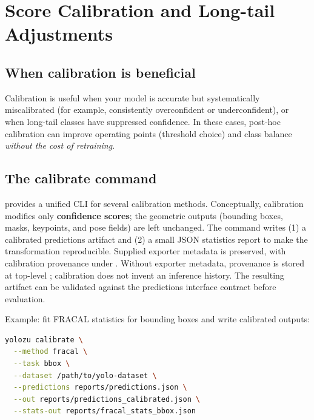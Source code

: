 \chapter{Score Calibration and Long-tail Adjustments}
\label{chap:calibration}



\section{When calibration is beneficial}
Calibration is useful when your model is accurate but systematically miscalibrated (for example, consistently overconfident or underconfident), or when long-tail classes have suppressed confidence.
In these cases, post-hoc calibration can improve operating points (threshold choice) and class balance \emph{without the cost of retraining}.

\section{The calibrate command}
\yolozu{} provides a unified CLI for several calibration methods.
Conceptually, calibration modifies only \textbf{confidence scores}; the geometric outputs (bounding boxes, masks, keypoints, and pose fields) are left unchanged.
The command writes (1) a calibrated predictions artifact and (2) a small JSON statistics report to make the transformation reproducible.
Supplied exporter metadata is preserved, with calibration provenance under
. Without exporter metadata, provenance is stored
at top-level ; calibration does not invent an inference history.
The resulting artifact can be validated against the predictions interface contract before evaluation.

Example: fit FRACAL statistics for bounding boxes and write calibrated outputs:
\begin{lstlisting}[language=bash]
yolozu calibrate \
  --method fracal \
  --task bbox \
  --dataset /path/to/yolo-dataset \
  --predictions reports/predictions.json \
  --out reports/predictions_calibrated.json \
  --stats-out reports/fracal_stats_bbox.json
\end{lstlisting}


